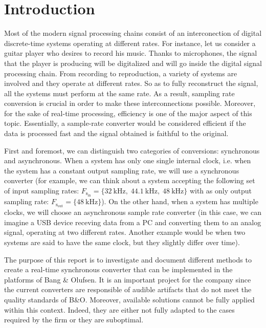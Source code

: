 

\chapter{Introduction} \label{gen_intro}%

\label{Chapter1} %

Most of the modern signal processing chains consist of an interconection of digital discrete-time systems operating at different rates. For instance, let us consider a guitar player who desires to record his music. Thanks to microphones, the signal that the player is producing will be digitalized and will go inside the digital signal processing chain. From recording to reproduction, a variety of systems are involved and they operate at different rates. So as to fully reconstruct the signal, all the systems must perform at the same rate. As a result, sampling rate conversion is crucial in order to make these interconnections possible. Moreover, for the sake of real-time processing, efficiency is one of the major aspect of this topic. Essentially, a sample-rate converter would be considered efficient if the data is processed fast and the signal obtained is faithful to the original.


 
First and foremost, we can distinguish two categories of conversions: synchronous and asynchronous. When a system has only one single internal clock, i.e. when the system has a constant output sampling rate, we will use a synchronous converter (for example, we can think about a system accepting the following set of input sampling rates: $ F_\mathrm{s_{in}} = \{\SI{32}{\kilo \Hz}, \;  \SI{44.1}{\kilo \Hz}, \; \SI{48}{\kilo \Hz}  \}  $ with as only output sampling rate: $ F_\mathrm{s_{out}} = \{\SI{48}{\kilo \Hz} \}$). On the other hand, when a system has multiple clocks, we will choose an asynchronous sample rate converter (in this case, we can imagine a USB device receving data from a PC and converting them to an analog signal, operating at two different rates. Another example would be when two systems are said to have the same clock, but they slightly differ over time). 


The purpose of this report is to investigate and document different methods to create a real-time synchronous converter that can be implemented in the platforms of Bang \& Olufsen. It is an important project for the company since the current converters are responsible of audible artifacts that do not meet the quality standards of B\&O. Moreover, available solutions cannot be fully applied within this context. Indeed, they are either not fully adapted to the cases required by the firm or they are suboptimal. 


